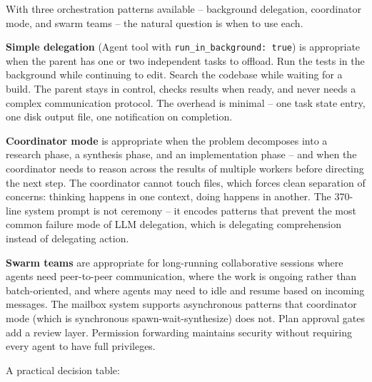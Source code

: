 \documentclass[
  english,
  11pt,
  letterpaper,
]{book}
\begin{document}
With three orchestration patterns available -- background delegation,
coordinator mode, and swarm teams -- the natural question is when to use
each.

\textbf{Simple delegation} (Agent tool with
\texttt{run\_in\_background:\ true}) is appropriate when the parent has
one or two independent tasks to offload. Run the tests in the background
while continuing to edit. Search the codebase while waiting for a build.
The parent stays in control, checks results when ready, and never needs
a complex communication protocol. The overhead is minimal -- one task
state entry, one disk output file, one notification on completion.

\textbf{Coordinator mode} is appropriate when the problem decomposes
into a research phase, a synthesis phase, and an implementation phase --
and when the coordinator needs to reason across the results of multiple
workers before directing the next step. The coordinator cannot touch
files, which forces clean separation of concerns: thinking happens in
one context, doing happens in another. The 370-line system prompt is not
ceremony -- it encodes patterns that prevent the most common failure
mode of LLM delegation, which is delegating comprehension instead of
delegating action.

\textbf{Swarm teams} are appropriate for long-running collaborative
sessions where agents need peer-to-peer communication, where the work is
ongoing rather than batch-oriented, and where agents may need to idle
and resume based on incoming messages. The mailbox system supports
asynchronous patterns that coordinator mode (which is synchronous
spawn-wait-synthesize) does not. Plan approval gates add a review layer.
Permission forwarding maintains security without requiring every agent
to have full privileges.

A practical decision table:
\end{document}
